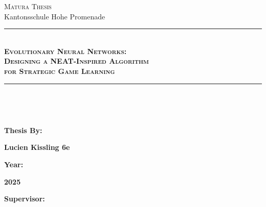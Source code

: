 \documentclass[11pt]{report}
\begin{document}
    \begin{titlepage}
        \BgThispage
        \color{white} {
            \begin{center}
                \Large \textsc{Matura Thesis}\\Kantonsschule Hohe Promenade\\
                \rule[0.1cm]{16.5cm}{0.1mm}\\
                \vspace{3cm}
                \Huge \textbf{ \textsc{Evolutionary Neural Networks: \\Designing a NEAT-Inspired Algorithm \\for Strategic Game Learning}}\\
                \vspace{3cm}
                \rule[0.1cm]{16.5cm}{0.1mm}\\
            \end{center}
            \vspace{12cm}\\
            \begin{minipage}[t]{0.47\textwidth}
                \large\textbf {Thesis By:}\\
            \end{minipage}
            \hfill
            \begin{minipage}[t]{0.47\textwidth}
                \raggedleft
                \large\textbf {Lucien Kissling 6e}\\
            \end{minipage}
            \begin{minipage}[t]{0.47\textwidth}
                \large \textbf {Year:}\\
            \end{minipage}
            \hfill
            \begin{minipage}[t]{0.47\textwidth}
                \raggedleft
                \large \textbf {2025}\\
            \end{minipage}
            \begin{minipage}[t]{0.47\textwidth}
                \large \textbf {Supervisor:}\\

\end{minipage}}
\end{titlepage}
\end{document}
